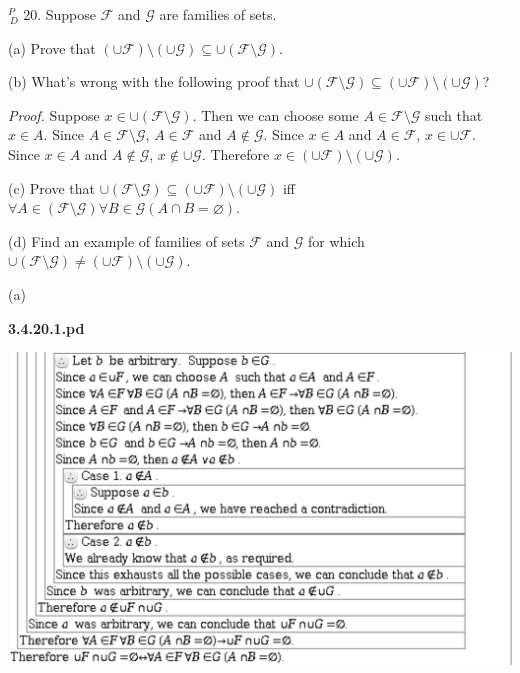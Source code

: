 \documentclass{article}
\begin{document}
\vspace{30pt}

$^{\textit{P}}_{\, \textit{D}}$ 20. Suppose $\mathcal{F}$ and $\mathcal{G}$ are families of sets.

\hspace{12pt}(a) Prove that $(\cup\mathcal{F}) \setminus (\cup\mathcal{G}) \subseteq \cup (\mathcal{F} \setminus \mathcal{G})$.

\hspace{12pt}(b) What's wrong with the following proof that $\cup(\mathcal{F} \setminus \mathcal{G}) \subseteq (\cup\mathcal{F}) \setminus (\cup\mathcal{G})$?

\textit{Proof.} Suppose $x \in \cup(\mathcal{F} \setminus \mathcal{G})$. Then we can choose some $A \in \mathcal{F} \setminus \mathcal{G}$ such that $x \in A$. Since $A \in \mathcal{F} \setminus \mathcal{G}$, $A \in \mathcal{F}$ and $A \notin \mathcal{G}$. Since $x \in A$ and $A \in \mathcal{F}$, $x \in \cup \mathcal{F}$. Since $x \in A$ and $A \notin \mathcal{G}$, $x \notin \cup \mathcal{G}$. Therefore $x \in (\cup \mathcal{F}) \setminus (\cup\mathcal{G})$.

\hspace{12pt}(c) Prove that $\cup(\mathcal{F} \setminus \mathcal{G}) \subseteq (\cup\mathcal{F}) \setminus (\cup\mathcal{G})$ iff $\forall A \in (\mathcal{F} \setminus \mathcal{G})\forall B \in \mathcal{G}(A \cap
B = \varnothing)$.

\hspace{12pt}(d) Find an example of families of sets $\mathcal{F}$ and $\mathcal{G}$ for which $\cup (\mathcal{F} \setminus \mathcal{G}) \neq (\cup\mathcal{F}) \setminus (\cup\mathcal{G})$.
\vspace{30pt}

(a)

\textbf{3.4.20.1.pd}
\vspace{10pt}

\includegraphics[width=\textwidth]{3_4_20_1}
\end{document}
